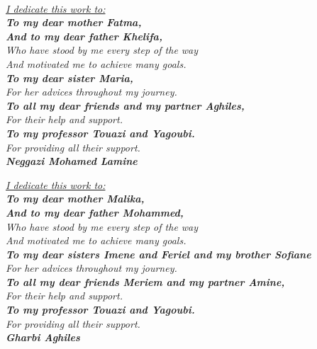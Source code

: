 \vspace*{0.1in}

\thispagestyle{empty}

\let\clearpage\relax
{}

\begin{center}
    \textit{\fontsize{34}{46}{\bfseries{\color{Black}{Dedication}}}}
    \\
    \vspace{0.2in}
    \itshape
    \Large{\underline{I dedicate this work to:}}\\          \textbf{\large{To my dear mother Fatma,}}\\\vspace{-0.1in}
    \textbf{\large{And to my dear father Khelifa,}}\\
    \large{Who have stood by me every step of the way\\\vspace{-0.1in}And motivated me to achieve many goals.}\\
    \textbf{\large{To my dear sister Maria,}}\\
    \large{For her advices throughout my journey.}\\
    \textbf{\large{To all my dear friends and my partner Aghiles,}}\\
    \large{For their help and support.}\\
    \textbf{\large{To my professor Touazi and Yagoubi.}}\\
    \large{For providing all their support.}\\
    \hfill\textbf{\Large{Neggazi Mohamed Lamine}}

    \vspace{0.18in}
    \itshape
    \Large{\underline{I dedicate this work to:}}\\          \textbf{\large{To my dear mother Malika,}}\\\vspace{-0.1in}
    \textbf{\large{And to my dear father Mohammed,}}\\
    \large{Who have stood by me every step of the way\\\vspace{-0.1in}And motivated me to achieve many goals.}\\
    \textbf{\large{To my dear sisters Imene and Feriel and my brother Sofiane}}\\
    \large{For her advices throughout my journey.}\\
    \textbf{\large{To all my dear friends Meriem and my partner Amine,}}\\
    \large{For their help and support.}\\
    \textbf{\large{To my professor Touazi and Yagoubi.}}\\
    \large{For providing all their support.}\\
    \hfill\textbf{\Large{Gharbi Aghiles}}

\end{center}


